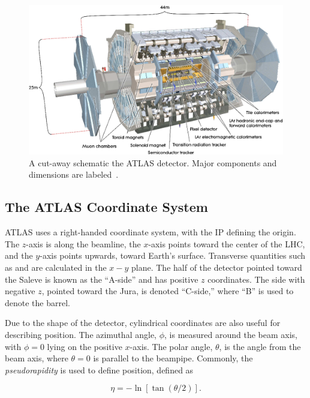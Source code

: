 \begin{figure}[!ht]
    \centering
    \includegraphics[width=.85\textwidth]{chapters/chapter2_experiment/images/atlas_detector.png}
    \caption[A cut-away schematic the ATLAS detector]{A cut-away schematic the ATLAS detector. Major components and dimensions are labeled~\cite{atlas-experiment}.}
    \label{fig:atlas}
\end{figure}

\subsection{The ATLAS Coordinate System}

ATLAS uses a right-handed coordinate system, with the \gls{IP} defining the origin. The $z$-axis is along the beamline, the $x$-axis points toward the center of the \gls{LHC}, and the $y$-axis points upwards, toward Earth's surface.  Transverse quantities such as \pt and \et are calculated in the $x-y$ plane. The half of the detector pointed toward the Saleve is known as the ``A-side'' and has positive $z$ coordinates. The side with negative $z$, pointed toward the Jura, is denoted ``C-side,'' where ``B'' is used to denote the barrel.

Due to the shape of the detector, cylindrical coordinates are also useful for describing position. The azimuthal angle, $\phi$, is measured around the beam axis, with $\phi=0$ lying on the positive $x$-axis. The polar angle, $\theta$, is the angle from the beam axis, where $\theta=0$ is parallel to the beampipe. Commonly, the \textit{pseudorapidity} is used to define position, defined as

\begin{equation}
    \eta = -\ln[\tan(\theta / 2)].
\end{equation}

